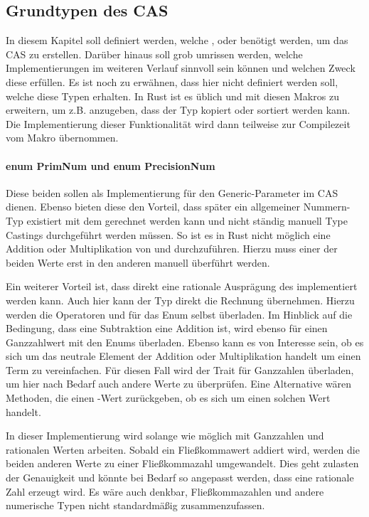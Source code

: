 \documentclass[11pt,a4paper, ngerman]{article}
\begin{document}
\subsection{Grundtypen des CAS}
In diesem Kapitel soll definiert werden, welche ,  oder  benötigt werden, um das CAS zu erstellen. Darüber hinaus soll grob umrissen werden, welche Implementierungen im weiteren Verlauf sinnvoll sein können und welchen Zweck diese erfüllen.
Es ist noch zu erwähnen, dass hier nicht definiert werden soll, welche  diese Typen erhalten. In Rust ist es üblich  und  mit diesen Makros zu erweitern, um z.B. anzugeben, dass der Typ kopiert oder sortiert werden kann. Die Implementierung dieser Funktionalität wird dann teilweise zur Compilezeit vom Makro übernommen.

\label{sec:NumTypes}
\paragraph{enum PrimNum und enum PrecisionNum} Diese beiden  sollen als Implementierung für den Generic-Parameter im CAS dienen. Ebenso bieten diese den Vorteil, dass später ein allgemeiner Nummern-Typ existiert mit dem gerechnet werden kann  und nicht ständig manuell Type Castings durchgeführt werden müssen. So ist es in Rust nicht möglich eine Addition oder Multiplikation von  und  durchzuführen. Hierzu muss einer der beiden Werte erst in den anderen manuell überführt werden.

Ein weiterer Vorteil ist, dass direkt eine rationale Ausprägung des  implementiert werden kann. Auch hier kann der Typ direkt die Rechnung übernehmen. Hierzu werden die Operatoren  und  für das Enum selbst überladen. Im Hinblick auf die Bedingung, dass eine Subtraktion eine Addition ist, wird ebenso  für einen Ganzzahlwert mit den Enums überladen. Ebenso kann es von Interesse sein, ob es sich um das neutrale Element der Addition oder Multiplikation handelt um einen Term zu vereinfachen. Für diesen Fall wird der Trait  für Ganzzahlen überladen, um hier nach Bedarf auch andere Werte zu überprüfen. Eine Alternative wären Methoden, die einen -Wert zurückgeben, ob es sich um einen solchen Wert handelt.

In dieser Implementierung wird  solange wie möglich mit Ganzzahlen und rationalen Werten arbeiten. Sobald ein Fließkommawert addiert wird, werden die beiden anderen Werte zu einer Fließkommazahl umgewandelt. Dies geht zulasten der Genauigkeit und könnte bei Bedarf so angepasst werden, dass eine rationale Zahl erzeugt wird. Es wäre auch denkbar, Fließkommazahlen und andere numerische Typen nicht standardmäßig zusammenzufassen.
\end{document}
